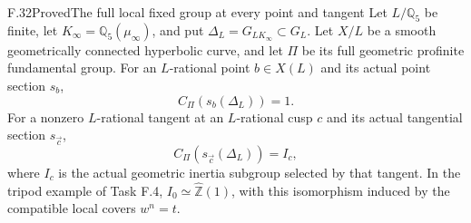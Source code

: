 \begin{statement}{F.32}{Proved}{The full local fixed group at every point and tangent}
Let $L/\mathbb Q_5$ be finite, let
$K_\infty=\mathbb Q_5(\mu_\infty)$, and put
$\Delta_L=G_{LK_\infty}\subset G_L$.
Let $X/L$ be a smooth geometrically connected
hyperbolic curve, and let $\Pi$ be its full
geometric profinite fundamental group.
For an $L$-rational point $b\in X(L)$ and its actual
point section $s_b$,
\[
 C_\Pi(s_b(\Delta_L))=1.                                  \tag{F.32.1}
\]
For a nonzero $L$-rational tangent at an
$L$-rational cusp $c$ and its actual tangential
section $s_{\vec c}$,
\[
 C_\Pi(s_{\vec c}(\Delta_L))=I_c,                          \tag{F.32.2}
\]
where $I_c$ is the actual geometric inertia
subgroup selected by that tangent.
In the tripod example of Task F.4,
$I_0\simeq\widehat{\mathbb Z}(1)$, with this
isomorphism induced by the compatible local
covers $w^n=t$.
\end{statement}
